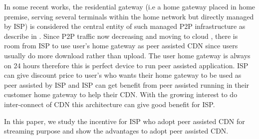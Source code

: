 \documentclass[paper]{ieice}
\begin{document}
In some recent works, the residential gateway (i.e a home gateway placed in home premise, serving several terminals within the home network but directly managed by ISP) is considered the central entity of such managed P2P infrastructure as describe in \cite{Misra:2010:IPS:1811099.1811064,Cha:2008:NTP:1855641.1855646}.
Since P2P traffic now decreasing and moving to cloud \cite{Labovitz:2010:IIT:2043164.1851194}, there is room from ISP to use user's home gateway as peer assisted CDN since users usually do more download rather than upload.
The user home gateway is always on 24 hours therefore this is perfect device to run peer assisted application.
ISP can give discount price to user's who wants their home gateway to be used as peer assisted by ISP and ISP can get benefit from peer assisted running in their customer home gateway to help their CDN.
With the growing interest to do inter-connect of CDN \cite{cdni,oceanproject} this architecture can give good benefit for ISP.    

In this paper, we study the incentive for ISP who adopt peer assisted CDN for streaming purpose and show the advantages to adopt peer assisted CDN. 



\end{document}
